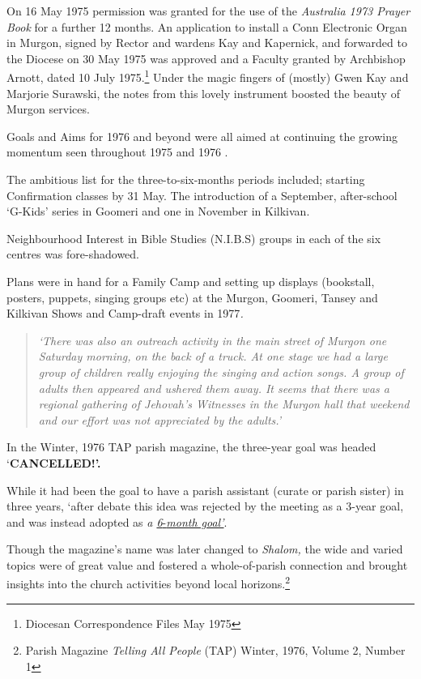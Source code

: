On 16 May 1975 permission was granted for the use of the \emph{Australia
1973 Prayer Book} for a further 12 months. An application to install a
Conn Electronic Organ in Murgon, signed by Rector and wardens Kay and
Kapernick, and forwarded to the Diocese on 30 May 1975 was approved and
a Faculty granted by Archbishop Arnott, dated 10 July 1975.\footnote{Diocesan
  Correspondence Files May 1975} Under the magic fingers of (mostly)
Gwen Kay and Marjorie Surawski, the notes from this lovely instrument
boosted the beauty of Murgon services.

Goals and Aims for 1976 and beyond were all aimed at continuing the
growing momentum seen throughout 1975 and 1976 .

The ambitious list for the three-to-six-months periods included;
starting Confirmation classes by 31 May. The introduction of a
September, after-school `G-Kids' series in Goomeri and one in November
in Kilkivan.

Neighbourhood Interest in Bible Studies (N.I.B.S) groups in each of the
six centres was fore-shadowed.

Plans were in hand for a Family Camp and setting up displays (bookstall,
posters, puppets, singing groups etc) at the Murgon, Goomeri, Tansey and
Kilkivan Shows and Camp-draft events in 1977\emph{.}

\begin{quote}
\emph{`There was also an outreach activity in the main street of Murgon
one Saturday morning, on the back of a truck. At one stage we had a
large group of children really enjoying the singing and action songs. A
group of adults then appeared and ushered them away. It seems that there
was a regional gathering of Jehovah's Witnesses in the Murgon hall that
weekend and our effort was not appreciated by the adults.'}
\end{quote}

In the Winter, 1976 TAP parish magazine, the three-year goal was headed
`\textbf{CANCELLED!'.}

While it had been the goal to have a parish assistant (curate or parish
sister) in three years, `after debate this idea was rejected by the
meeting as a 3-year goal, and was instead adopted as \emph{a
\underline{6}}\underline{-\emph{month goal'}}.

Though the magazine's name was later changed to \emph{Shalom,} the wide
and varied topics were of great value and fostered a whole-of-parish
connection and brought insights into the church activities beyond local
horizons.\footnote{Parish Magazine \emph{Telling All People} (TAP)
  Winter, 1976, Volume 2, Number 1}


